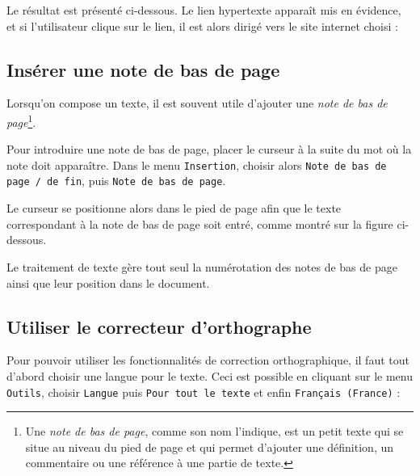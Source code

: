 
Le résultat est présenté ci-dessous. Le lien hypertexte apparaît mis en évidence, et si l'utilisateur clique sur le lien, il est alors dirigé vers le site internet choisi :





\subsection{Insérer une note de bas de page}\label{Texte2NoteBasPage}

Lorsqu'on compose un texte, il est souvent utile d'ajouter une \emph{note de bas de page}\footnote{Une \emph{note de bas de page}, comme son nom l'indique, est un petit texte qui se situe au niveau du pied de page et qui permet d'ajouter une définition, un commentaire ou une référence à une partie de texte.}.

Pour introduire une note de bas de page, placer le curseur à la suite du mot où la note doit apparaître. Dans le menu \texttt{Insertion}, choisir alors \texttt{Note de bas de page / de fin}, puis \texttt{Note de bas de page}.       


Le curseur se positionne alors dans le pied de page afin que le texte correspondant à la note de bas de page soit entré, comme montré sur la figure ci-dessous.


Le traitement de texte gère tout seul la numérotation des notes de bas de page ainsi que leur position dans le document.




\subsection{Utiliser le correcteur d'orthographe}\label{Texte2CorrecteurOrtho}

Pour pouvoir utiliser les fonctionnalités de correction orthographique, il faut tout d'abord choisir une langue pour le texte. Ceci est possible en cliquant sur le menu \texttt{Outils}, choisir \texttt{Langue} puis \texttt{Pour tout le texte} et enfin \texttt{Français (France)} :


